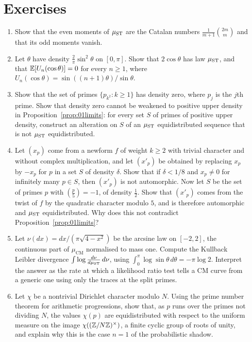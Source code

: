 \section{Exercises}

\begin{enumerate}
\item Show that the even moments of $\mu_{\mathrm{ST}}$ are the Catalan numbers $\frac1{m+1}\binom{2m}{m}$ and that its odd moments vanish.
\item Let $\theta$ have density $\frac2\pi\sin^2\theta$ on $[0,\pi]$. Show that $2\cos\theta$ has law $\mu_{\mathrm{ST}}$, and that $\mathbb{E}[U_n(\cos\theta)]=0$ for every $n\ge1$, where $U_n(\cos\theta)=\sin((n+1)\theta)/\sin\theta$.
\item Show that the set of primes $\{p_{k^2}:k\ge1\}$ has density zero, where $p_j$ is the $j$th prime. Show that density zero cannot be weakened to positive upper density in Proposition~\ref{prop:01limits}: for every set $S$ of primes of positive upper density, construct an alteration on $S$ of an $\mu_{\mathrm{ST}}$ equidistributed sequence that is not $\mu_{\mathrm{ST}}$ equidistributed.
\item Let $(x_p)$ come from a newform $f$ of weight $k\ge2$ with trivial character and without complex multiplication, and let $(x'_p)$ be obtained by replacing $x_p$ by $-x_p$ for $p$ in a set $S$ of density $\delta$. Show that if $\delta<1/8$ and $x_p\neq0$ for infinitely many $p\in S$, then $(x'_p)$ is not automorphic. Now let $S$ be the set of primes $p$ with $\left(\frac p5\right)=-1$, of density $\tfrac12$. Show that $(x'_p)$ comes from the twist of $f$ by the quadratic character modulo $5$, and is therefore automorphic and $\mu_{\mathrm{ST}}$ equidistributed. Why does this not contradict Proposition~\ref{prop:01limits}?
\item Let $\nu(dx)=dx/(\pi\sqrt{4-x^2})$ be the arcsine law on $[-2,2]$, the continuous part of $\mu_{\mathrm{CM}}$ normalised to mass one. Compute the Kullback Leibler divergence $\int\log\frac{d\nu}{d\mu_{\mathrm{ST}}}\,d\nu$, using $\int_0^\pi\log\sin\theta\,d\theta=-\pi\log2$. Interpret the answer as the rate at which a likelihood ratio test tells a CM curve from a generic one using only the traces at the split primes.
\item Let $\chi$ be a nontrivial Dirichlet character modulo $N$. Using the prime number theorem for arithmetic progressions, show that, as $p$ runs over the primes not dividing $N$, the values $\chi(p)$ are equidistributed with respect to the uniform measure on the image $\chi((\mathbb{Z}/N\mathbb{Z})^\times)$, a finite cyclic group of roots of unity, and explain why this is the case $n=1$ of the probabilistic shadow.
\end{enumerate}

